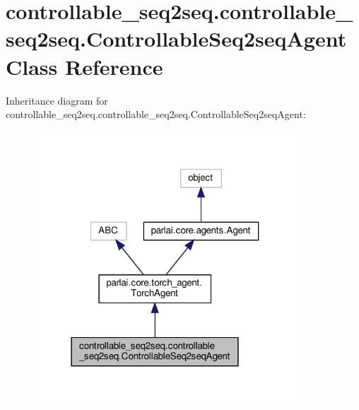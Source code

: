 \hypertarget{classcontrollable__seq2seq_1_1controllable__seq2seq_1_1ControllableSeq2seqAgent}{}\section{controllable\+\_\+seq2seq.\+controllable\+\_\+seq2seq.\+Controllable\+Seq2seq\+Agent Class Reference}
\label{classcontrollable__seq2seq_1_1controllable__seq2seq_1_1ControllableSeq2seqAgent}


Inheritance diagram for controllable\+\_\+seq2seq.\+controllable\+\_\+seq2seq.\+Controllable\+Seq2seq\+Agent\+:
\nopagebreak
\begin{figure}[H]
\begin{center}
\leavevmode
\includegraphics[width=279pt]{classcontrollable__seq2seq_1_1controllable__seq2seq_1_1ControllableSeq2seqAgent__inherit__graph}
\end{center}
\end{figure}


